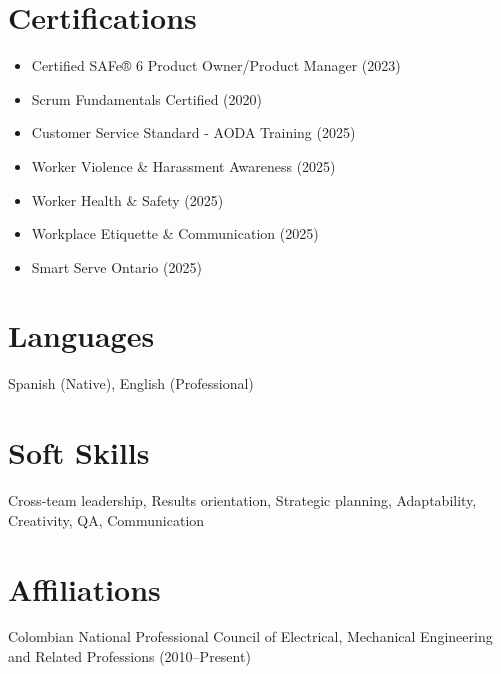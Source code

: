 \documentclass[a4paper,10pt]{article}
\begin{document}
\section*{\textcolor{myblue}{Certifications}}
\begin{itemize}
    \item Certified SAFe® 6 Product Owner/Product Manager (2023)
    \item Scrum Fundamentals Certified (2020)
    \item Customer Service Standard - AODA Training (2025)
    \item Worker Violence \& Harassment Awareness (2025)
    \item Worker Health \& Safety (2025)
    \item Workplace Etiquette \& Communication (2025)
    \item Smart Serve Ontario (2025)	
\end{itemize}

\section*{\textcolor{myblue}{Languages}}
Spanish (Native), English (Professional)

\section*{\textcolor{myblue}{Soft Skills}}
Cross-team leadership, Results orientation, Strategic planning, Adaptability, Creativity, QA, Communication

\section*{\textcolor{myblue}{Affiliations}}
Colombian National Professional Council of Electrical, Mechanical Engineering and Related Professions (2010–Present)
\end{document}
